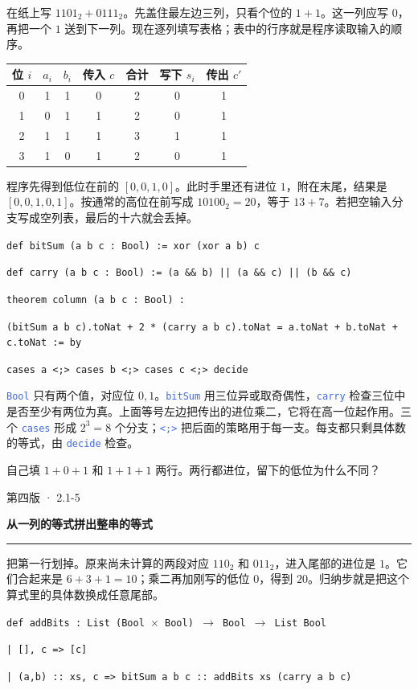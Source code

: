 \documentclass[UTF8,11pt,a4paper,fontset=fandol]{ctexart}
\newcommand{\HandoutLesson}[2]{%
  \par{\small\heiti\color{BrickRed}#1}\par\vspace{3pt}
  {\fontsize{21}{27}\selectfont\heiti\bfseries #2}\par
  \textcolor{BrickRed}{\rule{\linewidth}{.7pt}}\par}
\newcommand{\HandoutBox}[1]{%
  \par\noindent\begingroup\setlength{\fboxsep}{8pt}%
  \colorbox{BrickRed!9}{\parbox{\dimexpr\linewidth-16pt\relax}{#1}}\endgroup\par}
\newcommand{\src}[1]{\textcolor{RoyalBlue}{\texttt{#1}}}
\newcommand{\subhead}[1]{\par\vspace{3pt}{\heiti\bfseries\color{RoyalBlue}#1}\par}
\newenvironment{leanblock}{\par\smallskip\noindent\begin{lrbox}{\leanbox}\begin{minipage}{\dimexpr\linewidth-12pt\relax}\raggedright\small\setlength{\parskip}{0pt}}{\end{minipage}\end{lrbox}\colorbox{RoyalBlue!6}{\usebox{\leanbox}}\par\smallskip}
\newcommand{\lineofcode}[2]{\noindent\hspace*{#1em}\strut\texttt{#2}\par}
\begin{document}
在纸上写 $1101_2+0111_2$。先盖住最左边三列，只看个位的 $1+1$。这一列应写 $0$，再把一个 $1$ 送到下一列。现在逐列填写表格；表中的行序就是程序读取输入的顺序。
\begin{center}\begin{tabular}{ccccccc}\toprule 位 $i$ & $a_i$ & $b_i$ & 传入 $c$ & 合计 & 写下 $s_i$ & 传出 $c'$\\\midrule
0&1&1&0&2&0&1\\1&0&1&1&2&0&1\\2&1&1&1&3&1&1\\3&1&0&1&2&0&1\\\bottomrule\end{tabular}\end{center}
程序先得到低位在前的 $[0,0,1,0]$。此时手里还有进位 $1$，附在末尾，结果是 $[0,0,1,0,1]$。按通常的高位在前写成 $10100_2=20$，等于 $13+7$。若把空输入分支写成空列表，最后的十六就会丢掉。
\subhead{把一行表变成一个定理}
\begin{leanblock}
\lineofcode{0.0}{def bitSum (a b c : Bool) := xor (xor a b) c}
\end{leanblock}
\begin{leanblock}
\lineofcode{0.0}{def carry (a b c : Bool) := (a \&\& b) || (a \&\& c) || (b \&\& c)}
\end{leanblock}
\begin{leanblock}
\lineofcode{0.0}{theorem column (a b c : Bool) :}
\lineofcode{1.8}{(bitSum a b c).toNat + 2 * (carry a b c).toNat = a.toNat + b.toNat + c.toNat := by}
\lineofcode{0.9}{cases a <;> cases b <;> cases c <;> decide}
\end{leanblock}
\src{Bool} 只有两个值，对应位 $0,1$。\src{bitSum} 用三位异或取奇偶性，\src{carry} 检查三位中是否至少有两位为真。上面等号左边把传出的进位乘二，它将在高一位起作用。三个 \src{cases} 形成 $2^3=8$ 个分支；\src{<;>} 把后面的策略用于每一支。每支都只剩具体数的等式，由 \src{decide} 检查。
\HandoutBox{自己填 $1+0+1$ 和 $1+1+1$ 两行。两行都进位，留下的低位为什么不同？}
\par{}
\clearpage{}\label{p24}\HandoutLesson{第四版 · 2.1-5}{从一列的等式拼出整串的等式}
把第一行划掉。原来尚未计算的两段对应 $110_2$ 和 $011_2$，进入尾部的进位是 $1$。它们合起来是 $6+3+1=10$；乘二再加刚写的低位 $0$，得到 $20$。归纳步就是把这个算式里的具体数换成任意尾部。
\begin{leanblock}
\lineofcode{0.0}{def addBits : List (Bool \ensuremath{\times} Bool) \ensuremath{\to} Bool \ensuremath{\to} List Bool}
\lineofcode{0.9}{| [], c => [c]}
\lineofcode{0.9}{| (a,b) :: xs, c => bitSum a b c :: addBits xs (carry a b c)}
\end{leanblock}
\end{document}
